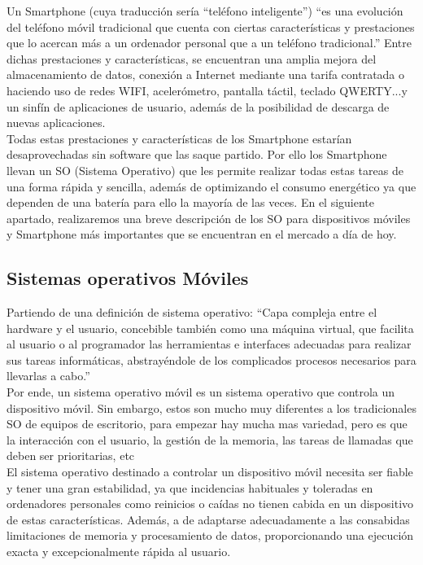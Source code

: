 \documentclass[../pfc.tex]{subfiles}
\begin{document}
	Un Smartphone (cuya traducción sería “teléfono inteligente”) “es una evolución del teléfono móvil tradicional que cuenta con ciertas características y prestaciones que lo acercan más a un ordenador personal que a un teléfono tradicional.”
	Entre dichas prestaciones y características, se encuentran una amplia mejora del almacenamiento de datos, conexión a Internet mediante una tarifa contratada o haciendo uso de redes WIFI, acelerómetro, pantalla táctil, teclado QWERTY...y un sinfín de aplicaciones de usuario, además de la posibilidad de descarga de nuevas aplicaciones.\\
	Todas estas prestaciones y características de los Smartphone estarían desaprovechadas sin software que las saque partido. Por ello los Smartphone llevan un SO (Sistema Operativo) que les permite realizar todas estas tareas de una forma rápida y sencilla, además de optimizando el consumo energético ya que dependen de una batería para ello la mayoría de las veces. 
	En el siguiente apartado, realizaremos una breve descripción de los SO para dispositivos móviles y Smartphone más importantes que se encuentran en el mercado a día de hoy.
	
	\subsection{Sistemas operativos Móviles}
	Partiendo de una definición de sistema operativo: “Capa compleja entre el hardware y el usuario, concebible también como una máquina virtual, que facilita al usuario o al programador las herramientas e interfaces adecuadas para realizar sus tareas informáticas, abstrayéndole de los complicados procesos necesarios para llevarlas a cabo.”\\
	
	Por ende, un sistema operativo móvil es un sistema operativo que controla un dispositivo móvil. Sin embargo, estos son mucho muy diferentes a los tradicionales SO de equipos de escritorio, para empezar hay mucha mas variedad, pero es que la interacción con el usuario, la gestión de la memoria, las tareas de llamadas que deben ser prioritarias, etc\\
	
	El sistema operativo destinado a controlar un dispositivo móvil necesita ser fiable y tener una gran estabilidad, ya que incidencias habituales y toleradas en ordenadores personales como reinicios o caídas no tienen cabida en un dispositivo de estas características. Además, a de adaptarse adecuadamente a las consabidas limitaciones de memoria y procesamiento de datos, proporcionando una ejecución exacta y excepcionalmente rápida al usuario.\\
	
\end{document}
